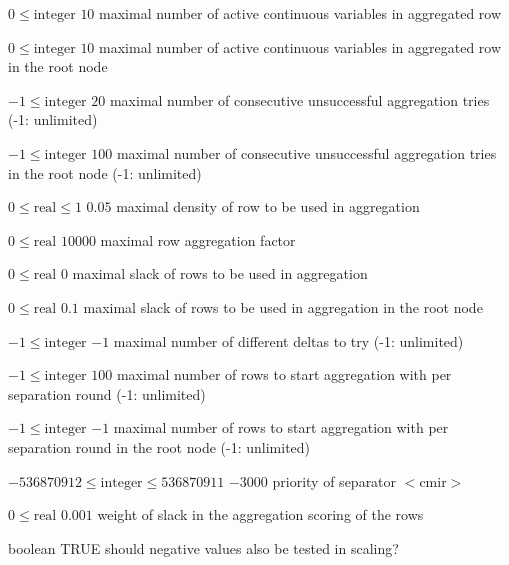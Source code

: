 %
{$0\leq\textrm{integer}$}%
{$10$}%
{maximal number of active continuous variables in aggregated row}%
{}

%
{$0\leq\textrm{integer}$}%
{$10$}%
{maximal number of active continuous variables in aggregated row in the root node}%
{}

%
{$-1\leq\textrm{integer}$}%
{$20$}%
{maximal number of consecutive unsuccessful aggregation tries (-1: unlimited)}%
{}

%
{$-1\leq\textrm{integer}$}%
{$100$}%
{maximal number of consecutive unsuccessful aggregation tries in the root node (-1: unlimited)}%
{}

%
{$0\leq\textrm{real}\leq1$}%
{$0.05$}%
{maximal density of row to be used in aggregation}%
{}

%
{$0\leq\textrm{real}$}%
{$10000$}%
{maximal row aggregation factor}%
{}

%
{$0\leq\textrm{real}$}%
{$0$}%
{maximal slack of rows to be used in aggregation}%
{}

%
{$0\leq\textrm{real}$}%
{$0.1$}%
{maximal slack of rows to be used in aggregation in the root node}%
{}

%
{$-1\leq\textrm{integer}$}%
{$-1$}%
{maximal number of different deltas to try (-1: unlimited)}%
{}

%
{$-1\leq\textrm{integer}$}%
{$100$}%
{maximal number of rows to start aggregation with per separation round (-1: unlimited)}%
{}

%
{$-1\leq\textrm{integer}$}%
{$-1$}%
{maximal number of rows to start aggregation with per separation round in the root node (-1: unlimited)}%
{}

%
{$-536870912\leq\textrm{integer}\leq536870911$}%
{$-3000$}%
{priority of separator $<$cmir$>$}%
{}

%
{$0\leq\textrm{real}$}%
{$0.001$}%
{weight of slack in the aggregation scoring of the rows}%
{}

%
{boolean}%
{TRUE}%
{should negative values also be tested in scaling?}%
{}

